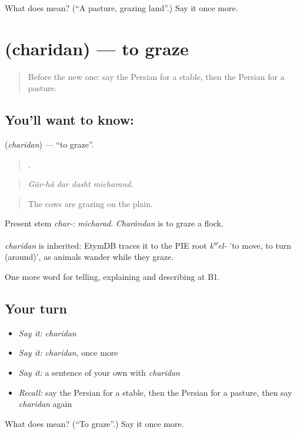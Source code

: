 \begin{tcolorbox}[breakable,colback=teal!4,colframe=teal!35!black,title={Before you move on}]
What does  mean? (\textquotedblleft{}A pasture, grazing land\textquotedblright{}.) Say it once more.
\end{tcolorbox}
\section[\texorpdfstring{\fa{چریدن} (charidan)}{چریدن (charidan)}]{ (charidan) — to graze}

\label{lesson:FA-C466-charidan}



\begin{quote}
Before the new one: say the Persian for a stable, then the Persian for a pasture.
\end{quote}

\subsection*{You'll want to know: }
\textbf{} (\emph{charidan}) — \textquotedblleft{}to graze\textquotedblright{}.

\begin{quote}
   .
\end{quote}

\begin{quote}
\emph{Gâv-hâ dar dasht micharand.}
\end{quote}

\begin{quote}
The cows are grazing on the plain.
\end{quote}

Present stem \emph{char-}: \emph{micharad}. \emph{Charândan} is to graze a flock.

\begin{cousinweb}
\emph{charidan} is inherited: EtymDB traces it to the PIE root \emph{k\textsuperscript{w}el-} 'to move, to turn (around)', as animals wander while they graze.
\end{cousinweb}

\begin{grammarlens}[title={What you've built}]
One more word for telling, explaining and describing at B1.
\end{grammarlens}

\subsection*{Your turn}
\begin{itemize}
\raggedright
  \item \emph{Say it:} \emph{charidan}
  \item \emph{Say it:} \emph{charidan}, once more
  \item \emph{Say it:} a sentence of your own with \emph{charidan}
  \item \emph{Recall:} say the Persian for a stable, then the Persian for a pasture, then say \emph{charidan} again
\end{itemize}

\begin{tcolorbox}[breakable,colback=teal!4,colframe=teal!35!black,title={Before you move on}]
What does  mean? (\textquotedblleft{}To graze\textquotedblright{}.) Say it once more.
\end{tcolorbox}
